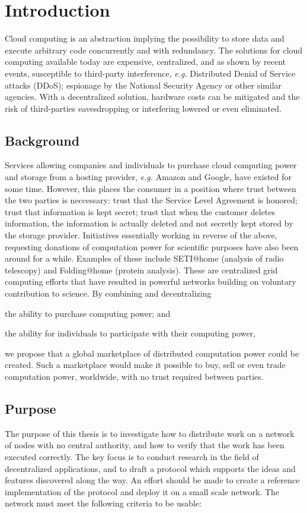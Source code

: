 \chapter{Introduction}
Cloud computing is an abstraction implying the possibility to store data and execute arbitrary code concurrently and with redundancy. The solutions for cloud computing available today are expensive, centralized, and as shown by recent events, susceptible to third-party interference, \textit{e.g.} Distributed Denial of Service attacks (DDoS); espionage by the National Security Agency or other similar agencies. With a decentralized solution, hardware costs can be mitigated and the risk of third-parties eavesdropping or interfering lowered or even eliminated.

\section{Background}
Services allowing companies and individuals to purchase cloud computing power and storage from a hosting provider, \emph{e.g.} Amazon and Google, have existed for some time. However, this places the consumer in a position where trust between the two parties is neccessary: trust that the Service Level Agreement is honored; trust that information is kept secret; trust that when the customer deletes information, the information is actually deleted and not secretly kept stored by the storage provider. Initiatives essentially working in reverse of the above, requesting donations of computation power for scientific purposes have also been around for a while. Examples of these include SETI@home (analysis of radio telescopy) and Folding@home (protein analysis). These are centralized grid computing efforts that have resulted in powerful networks building on voluntary contribution to science. By combining and decentralizing
\begin{inparaenum}
\item the ability to purchase computing power; and
\item the ability for individuals to participate with their computing power,
\end{inparaenum}
we propose that a global marketplace of distributed computation power could be created. Such a marketplace would make it possible to buy, sell or even trade computation power, worldwide, with no trust required between parties.

\section{Purpose}
\label{sec:intro:purpose}
The purpose of this thesis is to investigate how to distribute work on a network of nodes with no central authority, and how to verify that the work has been executed correctly. The key focus is to conduct research in the field of decentralized applications, and to draft a protocol which supports the ideas and features discovered along the way. An effort should be made to create a reference implementation of the protocol and deploy it on a small scale network. The network must meet the following criteria to be usable:

